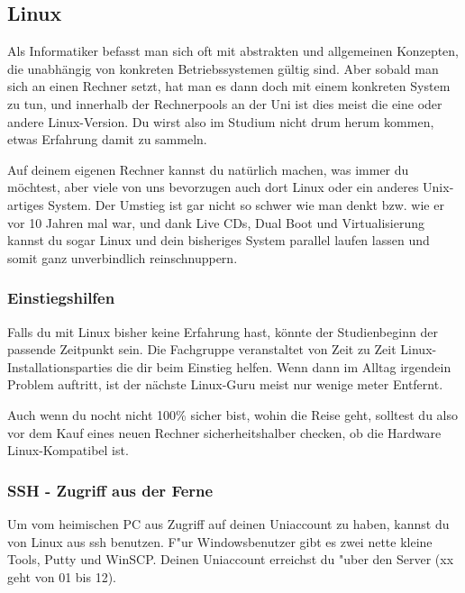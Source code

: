 \subsection{Linux}
\label{linux}
Als Informatiker befasst man sich oft mit abstrakten und allgemeinen 
Konzepten, die unabhängig von konkreten Betriebssystemen gültig sind. 
Aber sobald man sich an einen Rechner setzt, hat man es dann doch mit 
einem konkreten System zu tun, und innerhalb der Rechnerpools an der Uni
ist dies meist die eine oder andere Linux-Version. Du wirst also im 
Studium nicht drum herum kommen, etwas Erfahrung damit zu sammeln.

Auf deinem eigenen Rechner kannst du natürlich machen,
was immer du möchtest, aber viele von uns bevorzugen auch dort Linux
oder ein anderes Unix-artiges System. Der Umstieg ist gar nicht so
schwer wie man denkt bzw. wie er vor 10 Jahren mal war, und dank Live CDs,
Dual Boot und Virtualisierung kannst du sogar Linux und dein bisheriges 
System parallel laufen lassen und somit ganz unverbindlich reinschnuppern.

\subsubsection{Einstiegshilfen}
Falls du mit Linux bisher keine Erfahrung hast, könnte der Studienbeginn
 der passende Zeitpunkt sein. Die Fachgruppe veranstaltet von Zeit zu Zeit 
Linux-Installationsparties die dir beim Einstieg helfen. Wenn dann im Alltag
irgendein Problem auftritt, ist der nächste Linux-Guru meist nur wenige
meter Entfernt.

Auch wenn du nocht nicht 100\% sicher bist, wohin die Reise geht, solltest 
du also vor dem Kauf eines neuen Rechner sicherheitshalber checken, ob die 
Hardware Linux-Kompatibel ist.

\subsubsection{SSH - Zugriff aus der Ferne}
Um vom heimischen PC aus Zugriff auf deinen Uniaccount zu haben, kannst
du von Linux aus ssh benutzen. F"ur Windowsbenutzer gibt es zwei nette
kleine Tools, Putty und WinSCP. Deinen Uniaccount erreichst du "uber
den Server  (xx geht von 01 bis 12).

